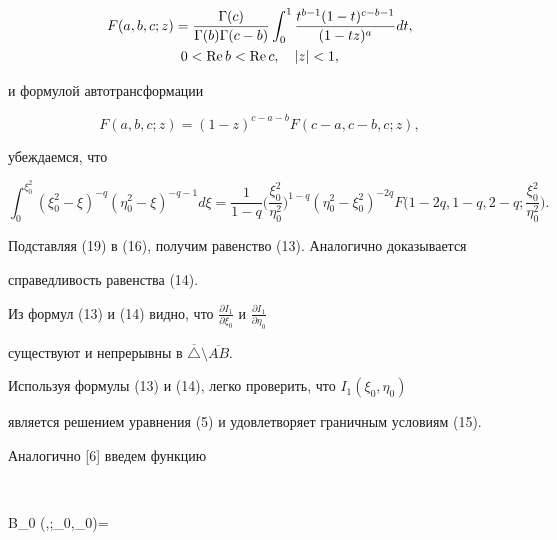 \begin{pf}
\begin{gather}
F(a,b,c;z)=\frac{\Gamma(c)}{\Gamma(b)\Gamma(c-b)} \int_0^1 


\frac{t^{b-1} (1-t)^{c-b-1}}{(1-tz)^a} dt, \notag \\


0< \re b< \re c, \quad |z|<1,


\end{gather}


и формулой автотрансформации


\begin{equation}


F(a,b,c;z)=(1-z)^{c-a-b} F(c-a,c-b,c;z),


\end{equation}


убеждаемся, что


\begin{equation}


\int_0^{\xi_0^2} (\xi_0^2-\xi)^{-q} (\eta_0^2-\xi)^{-q-1} d\xi= 


\frac{1}{1-q} \bigg(\frac{\xi_0^2}{\eta_0^2}\bigg)^{1-q}


(\eta_0^2-\xi_0^2)^{-2q}


F\bigg(1-2q,1-q,2-q;\frac{\xi_0^2}{\eta_0^2}\bigg).


\end{equation}


Подставляя (19) в (16), получим равенство (13). Аналогично доказывается 


справедливость равенства (14).





Из формул (13) и (14) видно, что ${\frac{\partial I_1}


{\partial \xi_0 }}$ и ${\frac{\partial I_1}{\partial \eta_0 }}$ 


существуют и непрерывны в $\overline\triangle\setminus\overline{AB}$.





Используя формулы (13) и (14), легко проверить, что $I_1(\xi_0,\eta_0)$


является решением уравнения (5) и удовлетворяет граничным условиям (15).


\end{pf}





Аналогично [6] введем функцию 


$$


B_0 (\xi,\eta;\xi_0,\eta_0)=


